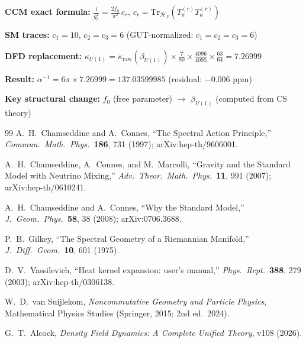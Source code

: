 \documentclass[12pt,a4paper]{article}
\begin{document}
\begin{tcolorbox}[colback=blue!5!white, colframe=blue!50!black,
  title=Summary: CCM $\to$ DFD Gauge Coupling]
\textbf{CCM exact formula:}
$\displaystyle\frac{1}{g_r^2} = \frac{2f_0}{\pi^2}\,c_r$,
\quad $c_r = \mathrm{Tr}_{\mathcal{H}_F}(T^{(r)}_a T^{(r)}_a)$

\textbf{SM traces:} $c_1 = 10$, $c_2 = c_3 = 6$
\quad (GUT-normalized: $c_1 = c_2 = c_3 = 6$)

\textbf{DFD replacement:}
$\displaystyle\kappa_{U(1)} = \kappa_{\mathrm{raw}}(\beta_{U(1)})
\times \frac{7}{80} \times \frac{4096}{4095} \times \frac{63}{64}
= 7.26999$

\textbf{Result:}
$\alpha^{-1} = 6\pi \times 7.26999 = 137.03599985$
\quad (residual: $-0.006$ ppm)

\textbf{Key structural change:}
$f_0$ (free parameter) $\to$ $\beta_{U(1)}$ (computed from CS theory)
\end{tcolorbox}

\begin{thebibliography}{99}
A.~H.~Chamseddine and A.~Connes,
``The Spectral Action Principle,''
\textit{Commun.\ Math.\ Phys.}\ \textbf{186}, 731 (1997);
arXiv:hep-th/9606001.

A.~H.~Chamseddine, A.~Connes, and M.~Marcolli,
``Gravity and the Standard Model with Neutrino Mixing,''
\textit{Adv.\ Theor.\ Math.\ Phys.}\ \textbf{11}, 991 (2007);
arXiv:hep-th/0610241.

A.~H.~Chamseddine and A.~Connes,
``Why the Standard Model,''
\textit{J.\ Geom.\ Phys.}\ \textbf{58}, 38 (2008);
arXiv:0706.3688.

P.~B.~Gilkey,
``The Spectral Geometry of a Riemannian Manifold,''
\textit{J.\ Diff.\ Geom.}\ \textbf{10}, 601 (1975).

D.~V.~Vassilevich,
``Heat kernel expansion: user's manual,''
\textit{Phys.\ Rept.}\ \textbf{388}, 279 (2003);
arXiv:hep-th/0306138.

W.~D.~van Suijlekom,
\textit{Noncommutative Geometry and Particle Physics},
Mathematical Physics Studies (Springer, 2015; 2nd ed.\ 2024).

G.~T.~Alcock,
\textit{Density Field Dynamics: A Complete Unified Theory}, v108 (2026).
\end{thebibliography}
\end{document}
